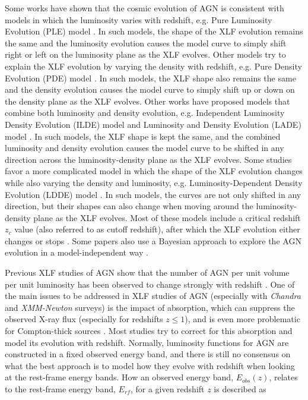 \documentclass[fleqn,usenatbib]{mnras}
\begin{document}
Some works have shown that the cosmic evolution of AGN is consistent with models in which the luminosity varies with redshift, e.g. Pure Luminosity Evolution (PLE) model \citep{barger2005cosmic}.
In such models, the shape of the XLF evolution remains the same and the luminosity evolution causes the model curve to simply shift right or left on the luminosity plane as the XLF evolves.
Other models try to explain the XLF evolution by varying the density with redshift, e.g. Pure Density Evolution (PDE) model \citep{fotopoulou2016xlf}.
In such models, the XLF shape also remains the same and the density evolution causes the model curve to simply shift up or down on the density plane as the XLF evolves.
Other works have proposed models that combine both luminosity and density evolution, e.g. Independent Luminosity Density Evolution (ILDE) model \citep{yencho2009hardxlfagn} and Luminosity and Density Evolution (LADE) model \citep{aird2010hardxlf}.
In such models, the XLF shape is kept the same, and the combined luminosity and density evolution causes the model curve to be shifted in any direction across the luminosity-density plane as the XLF evolves.
Some studies favor a more complicated model in which the shape of the XLF evolution changes while also varying the density and luminosity, e.g. Luminosity-Dependent Density Evolution (LDDE) model \citep{hasinger2005luminosity, ueda2014evo}.
In such models, the curves are not only shifted in any direction, but their shapes can also change when moving around the luminosity-density plane as the XLF evolves.
Most of these models include a critical redshift $z_{c}$ value (also referred to as cutoff redshift), after which the XLF evolution either changes or stops \citep{fotopoulou2016xlf}. 
Some papers also use a Bayesian approach to explore the AGN evolution in a model-independent way \citep{georgakakis2015xlf, fotopoulou2016xlf}.

Previous XLF studies of AGN show that the number of AGN per unit volume per unit luminosity has been observed to change strongly with redshift \citep{ebrero2009xmm}.
One of the main issues to be addressed in XLF studies of AGN (especially with \textit{Chandra} and \textit{XMM-Newton} surveys) is the impact of absorption, which can suppress the observed X-ray flux (especially for redshifts $z \leq 1$), and is even more problematic for Compton-thick sources \citep{aird2015nustar}. 
Most studies try to correct for this absorption and model its evolution with redshift. 
Normally, luminosity functions for AGN are constructed in a fixed observed energy band, and there is still no consensus on what the best approach is to model how they evolve with redshift when looking at the rest-frame energy bands. 
How an observed energy band, $E_{obs}(z)$, relates to the rest-frame energy band, $E_{rf}$, for a given redshift $z$ is described as
	
\end{document}
